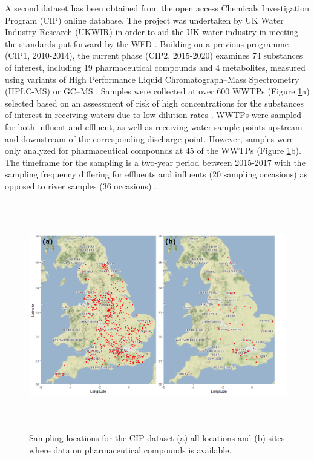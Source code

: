 \documentclass{article}
\begin{document}
A second dataset  has been obtained from the open access Chemicals Investigation Program (CIP) online database. The project was undertaken by UK Water Industry Research (UKWIR) in order to aid the UK water industry in meeting the standards put forward by the WFD \citep{Comber2018ActiveConcern}. Building on a previous programme (CIP1, 2010-2014), the current phase (CIP2, 2015-2020) examines 74 substances of interest, including 19 pharmaceutical compounds and 4 metabolites, measured using variants of High Performance Liquid Chromatograph–Mass Spectrometry (HPLC-MS) or GC–MS  \citep{Comber2018ActiveConcern}. Samples were collected at over 600 WWTPs (Figure \ref{fig_cip_locations}a) selected based on an assessment of risk of high concentrations for the substances of interest in receiving waters due to low dilution rates \citep{UKWIR2017THEFINDINGS}. WWTPs were sampled for both influent and effluent, as well as receiving water sample points upstream and downstream of the corresponding discharge point. However, samples were only analyzed for pharmaceutical compounds at 45 of the WWTPs (Figure \ref{fig_cip_locations}b). The timeframe for the sampling is a two-year period between 2015-2017 with the sampling frequency differing for effluents and influents (20 sampling occasions) as opposed to river samples (36 occasions) \citep{UKWIR2019SUBSCRIBEPORTAL}.

\begin{figure}
    \centering
    \includegraphics[height=10cm]{fig_CIP_locations.png}
    \caption{Sampling locations for the CIP dataset (a) all locations and (b) sites where data 
on pharmaceutical compounds is available.}
    \label{fig_cip_locations}
\end{figure}
\end{document}

